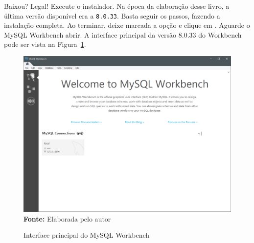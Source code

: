 Baixou? Legal! Execute o instalador. Na época da elaboração desse livro, a última versão disponível era a \texttt{8.0.33}. Basta seguir os passos, fazendo a instalação completa. Ao terminar, deixe marcada a opção  e clique em . Aguarde o MySQL Workbench abrir. A interface principal da versão 8.0.33 do Workbench pode ser vista na Figura~\ref{fig:cap04MySQLWorkbench}.

\FloatBarrier
\begin{figure}[!htbp]
    \centering
    \caption{Interface principal do MySQL Workbench}
    \includegraphics[scale=0.45]{imagens/cap04MySQLWorkbench}
    \\\textbf{Fonte:} Elaborada pelo autor
    \label{fig:cap04MySQLWorkbench}
\end{figure}
\FloatBarrier


